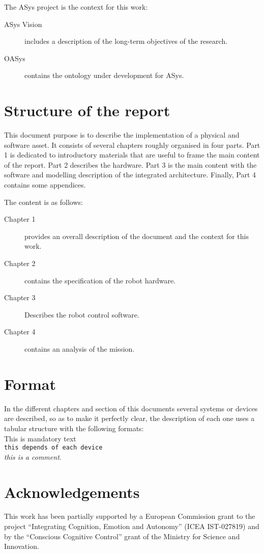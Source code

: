 The ASys project is the context for this work:

\begin{description}
\item [ASys Vision] includes a description of the long-term objectives of the research.
\item [OASys] contains the ontology under development for ASys.  
\end{description}

\section{Structure of the report}

This document purpose is to describe the implementation of a physical and
software asset. It consists of several chapters roughly organised in four
parts. Part 1 is dedicated to introductory materials that are useful to frame
the main content of the report. Part 2 describes the hardware. Part 3 is the
main content with the software and modelling description of the integrated architecture. 
Finally, Part 4 contains some appendices.

The content is as follows:

\begin{description}
  \item [Chapter 1] provides an overall description of the document
  and the context for this work. 
  \item [Chapter 2] contains the specification of the robot hardware.
  \item [Chapter 3] Describes the robot control software.
  \item [Chapter 4] contains an analysis of the mission.
\end{description}

\section{Format}

In the different chapters and section of this documents several systems or
devices are described, so as to make it perfectly clear, the description of
each one uses a tabular structure with the following formats: \\[2mm]
This is mandatory text\\ \texttt{this depends of each device}\\ \emph{this is a comment}.


\section{Acknowledgements}

This work has been partially supported by a European Commission grant to the
project ``Integrating Cognition, Emotion and Autonomy'' (ICEA IST-027819) and
by the ``Conscious Cognitive Control'' grant of the Ministry for Science and
Innovation.

